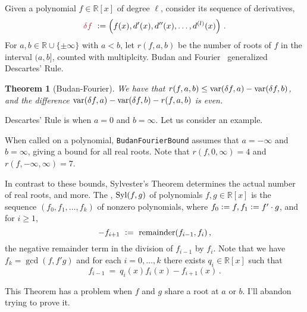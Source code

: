 \documentclass[12pt]{amsart}
\newtheorem{theorem}{Theorem}
\theoremstyle{definition}
\newcommand{\RR}{\mathbb{R}}
\DeclareMathOperator{\var}{{\rm var}}
\DeclareMathOperator{\Syl}{{\rm Syl}}
\newcommand{\defcolor}[1]{{\color{Maroon}#1}}
\newcommand{\demph}[1]{\defcolor{{\sl #1}}}
\begin{document}
Given a polynomial $f\in\RR[x]$ of degree $\ell$, consider its sequence of derivatives,
%
 \[
   \defcolor{\delta f}\ \vcentcolon= \left(f(x),d'(x),d''(x),\dots,d^{(l)}(x)\right)\,.
 \]
%
For $a,b\in \RR\cup\{\pm \infty\}$ with $a<b$, let \defcolor{$r(f,a,b)$} be the number of roots of $f$ in the interval $(a,b]$, counted
with multiplcity.
Budan and Fourier~\cite[Ch.\ 2]{So_Book} generalized Descartes' Rule.

\begin{theorem}[Budan-Fourier]
  We have that $r(f,a,b)\leq \var(\delta f,a) -\var(\delta f,b)$, and the difference
  $\var(\delta f,a) -\var(\delta f,b)-r(f,a,b)$ is even. 
\end{theorem}

Descartes' Rule is when $a=0$ and $b=\infty$.
Let us consider an example.
%
\begin{leftbar}

\end{leftbar}
%
When called on a polynomial, \texttt{BudanFourierBound} assumes that $a=-\infty$ and $b=\infty$, giving a bound for all real roots.
Note that $r(f,0,\infty)=4$ and $r(f,-\infty,\infty)=7$.

In contrast to these bounds, 
Sylvester's Theorem determines the actual number of real roots, and more.
The \demph{Sylvester sequence}, \defcolor{$\Syl(f,g)$} of polynomials $f,g\in\RR[x]$ is the sequence
$\left(f_0,f_1,\dotsc,f_k\right)$ of nonzero polynomials, where $f_0\vcentcolon= f, f_1 \vcentcolon= f'\cdot g$,
and for $i\geq 1$, 
%
  \[
    -f_{i+1}\ \vcentcolon=\ \mbox{remainder}(f_{i-1},f_i)\,,
  \]
%
the negative remainder term in the division of $f_{i-1}$ by $f_i$.
Note that we have $f_k = \gcd(f,f'g)$ and for each $i=0,\dotsc,k$ there exists $q_i\in\RR[x]$ such that
%
 \begin{equation}\label{Eq:divisionAlgorithm}
    f_{i-1}\ =\ q_i(x)f_i(x)-f_{i+1}(x)\,.
 \end{equation}



 {\color{Red}This Theorem has a problem when $f$ and $g$ share a root at $a$ or $b$.  I'll abandon trying to prove it.}
\end{document}
